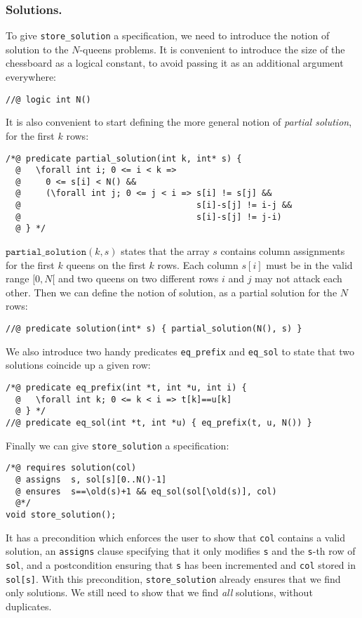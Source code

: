 \documentclass[a4paper]{llncs}
\begin{document}
\subsubsection{Solutions.}
To give \texttt{store\_solution} a specification, we need to introduce
the notion of solution to the $N$-queens problems. It is convenient to
introduce the size of the chessboard as a logical constant, to avoid
passing it as an additional argument everywhere:
\begin{verbatim}
//@ logic int N()
\end{verbatim}
It is also convenient to start defining the more general notion of
\emph{partial solution}, for the first $k$ rows:
\begin{verbatim}
/*@ predicate partial_solution(int k, int* s) {
  @   \forall int i; 0 <= i < k => 
  @     0 <= s[i] < N() &&
  @     (\forall int j; 0 <= j < i => s[i] != s[j] &&
  @                                   s[i]-s[j] != i-j &&
  @                                   s[i]-s[j] != j-i)
  @ } */
\end{verbatim}
$\mathtt{partial\_solution}(k,s)$ states that the array $s$ contains
column assignments for the first $k$ queens on the first $k$
rows. Each column $s[i]$ must be in the valid range $[0,N[$ and two
queens on two different rows $i$ and $j$ may not attack each other.
Then we can define the notion of solution, as a partial solution for
the $N$ rows:
\begin{verbatim}
//@ predicate solution(int* s) { partial_solution(N(), s) }
\end{verbatim}
We also introduce two handy predicates \texttt{eq\_prefix} and
\texttt{eq\_sol} to state that two solutions coincide up a given row:
\begin{verbatim}
/*@ predicate eq_prefix(int *t, int *u, int i) {
  @   \forall int k; 0 <= k < i => t[k]==u[k]
  @ } */
//@ predicate eq_sol(int *t, int *u) { eq_prefix(t, u, N()) } 
\end{verbatim}
Finally we can give \texttt{store\_solution} a specification:
\begin{verbatim}
/*@ requires solution(col)
  @ assigns  s, sol[s][0..N()-1]
  @ ensures  s==\old(s)+1 && eq_sol(sol[\old(s)], col)
  @*/
void store_solution();
\end{verbatim}
It has a precondition which enforces the user to show that
\texttt{col} contains a valid solution, an \texttt{assigns} clause
specifying that it only modifies \texttt{s} and the \texttt{s}-th row
of \texttt{sol}, and a postcondition ensuring that \texttt{s} has been
incremented and \texttt{col} stored in \verb!sol[s]!.
With this precondition, \texttt{store\_solution} already ensures that
we find only solutions. We still need to show that we find \emph{all}
solutions, without duplicates.
\end{document}
